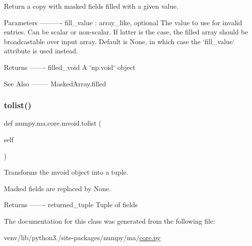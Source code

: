 \begin{DoxyVerb}Return a copy with masked fields filled with a given value.

Parameters
----------
fill_value : array_like, optional
    The value to use for invalid entries. Can be scalar or
    non-scalar. If latter is the case, the filled array should
    be broadcastable over input array. Default is None, in
    which case the `fill_value` attribute is used instead.

Returns
-------
filled_void
    A `np.void` object

See Also
--------
MaskedArray.filled\end{DoxyVerb}
 \mbox{\label{classnumpy_1_1ma_1_1core_1_1mvoid_ae64de3cb52e7a247ccfada2c3180006d}} 
\subsubsection{\texorpdfstring{tolist()}{tolist()}}
{\footnotesize\ttfamily def numpy.\+ma.\+core.\+mvoid.\+tolist (\begin{DoxyParamCaption}\item[{}]{self }\end{DoxyParamCaption})}

\begin{DoxyVerb}    Transforms the mvoid object into a tuple.

    Masked fields are replaced by None.

    Returns
    -------
    returned_tuple
Tuple of fields
\end{DoxyVerb}
 

The documentation for this class was generated from the following file\+:\begin{DoxyCompactItemize}
\item 
venv/lib/python3./site-\/packages/numpy/ma/\hyperlink{numpy_2ma_2core_8py}{core.\+py}\end{DoxyCompactItemize}
